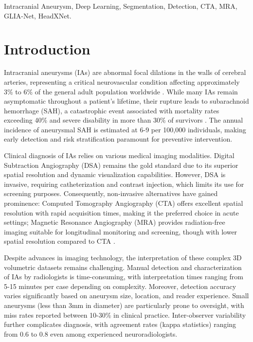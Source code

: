 \documentclass[conference]{IEEEtran}
\begin{document}
\begin{IEEEkeywords}
Intracranial Aneurysm, Deep Learning, Segmentation, Detection, CTA, MRA, GLIA-Net, HeadXNet.
\end{IEEEkeywords}

\section{Introduction}

Intracranial aneurysms (IAs) are abnormal focal dilations in the walls of cerebral arteries, representing a critical neurovascular condition affecting approximately 3\% to 6\% of the general adult population worldwide \cite{bo2021toward,vlak2011prevalence}. While many IAs remain asymptomatic throughout a patient's lifetime, their rupture leads to subarachnoid hemorrhage (SAH), a catastrophic event associated with mortality rates exceeding 40\% and severe disability in more than 30\% of survivors \cite{ueda2019deep}. The annual incidence of aneurysmal SAH is estimated at 6-9 per 100,000 individuals, making early detection and risk stratification paramount for preventive intervention.

Clinical diagnosis of IAs relies on various medical imaging modalities. Digital Subtraction Angiography (DSA) remains the gold standard due to its superior spatial resolution and dynamic visualization capabilities. However, DSA is invasive, requiring catheterization and contrast injection, which limits its use for screening purposes. Consequently, non-invasive alternatives have gained prominence: Computed Tomography Angiography (CTA) offers excellent spatial resolution with rapid acquisition times, making it the preferred choice in acute settings; Magnetic Resonance Angiography (MRA) provides radiation-free imaging suitable for longitudinal monitoring and screening, though with lower spatial resolution compared to CTA \cite{park2019headxnet}.

Despite advances in imaging technology, the interpretation of these complex 3D volumetric datasets remains challenging. Manual detection and characterization of IAs by radiologists is time-consuming, with interpretation times ranging from 5-15 minutes per case depending on complexity. Moreover, detection accuracy varies significantly based on aneurysm size, location, and reader experience. Small aneurysms (less than 3mm in diameter) are particularly prone to oversight, with miss rates reported between 10-30\% in clinical practice. Inter-observer variability further complicates diagnosis, with agreement rates (kappa statistics) ranging from 0.6 to 0.8 even among experienced neuroradiologists.
\end{document}

